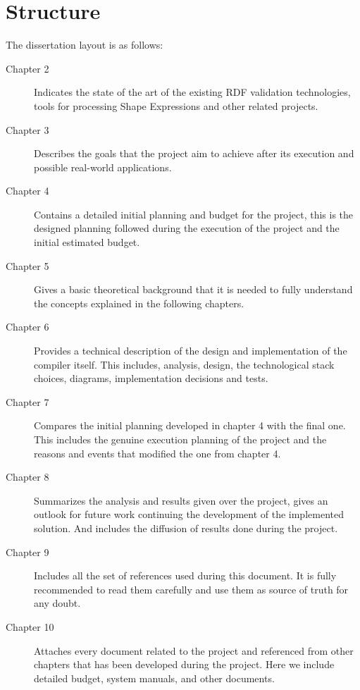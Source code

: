 \section{Structure}
The dissertation layout is as follows:\\

\begin{description}
	\item[Chapter 2] Indicates the state of the art of the existing RDF validation technologies, tools for processing Shape Expressions and other related projects.
	\item[Chapter 3] Describes the goals that the project aim to achieve after its execution and possible real-world applications.
	\item[Chapter 4] Contains a detailed initial planning and budget for the project, this is the designed planning followed during the execution of the project and the initial estimated budget.
	\item[Chapter 5] Gives a basic theoretical background that it is needed to fully understand the concepts explained in the following chapters.
	\item[Chapter 6] Provides a technical description of the design and implementation of the compiler itself. This includes, analysis, design, the technological stack choices, diagrams, implementation decisions and tests.
	\item[Chapter 7] Compares the initial planning developed in chapter 4 with the final one. This includes the genuine execution planning of the project and the reasons and events that modified the one from chapter 4.
	\item[Chapter 8] Summarizes the analysis and results given over the project, gives an outlook for future work continuing the development of the implemented solution. And includes the diffusion of results done during the project.
	\item[Chapter 9] Includes all the set of references used during this document. It is fully recommended to read them carefully and use them as source of truth for any doubt.
	\item[Chapter 10] Attaches every document related to the project and referenced from other chapters that has been developed during the project. Here we include detailed budget, system manuals, and other documents.
\end{description}
